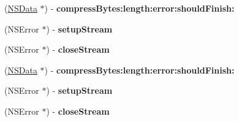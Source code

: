 \begin{DoxyCompactItemize}
\item 
\hypertarget{interface_a_s_i_data_compressor_a2190fb1c48f0fcc0a68fecbf04552f8c}{
(\hyperlink{class_n_s_data}{\-N\-S\-Data} $\ast$) -\/ {\bfseries compress\-Bytes\-:length\-:error\-:should\-Finish\-:}}
\label{interface_a_s_i_data_compressor_a2190fb1c48f0fcc0a68fecbf04552f8c}

\item 
\hypertarget{interface_a_s_i_data_compressor_af1a40ec1ac24132c7349fc0658639dfa}{
(\-N\-S\-Error $\ast$) -\/ {\bfseries setup\-Stream}}
\label{interface_a_s_i_data_compressor_af1a40ec1ac24132c7349fc0658639dfa}

\item 
\hypertarget{interface_a_s_i_data_compressor_a51d7144538df7dd6a6a19f91f9bfe298}{
(\-N\-S\-Error $\ast$) -\/ {\bfseries close\-Stream}}
\label{interface_a_s_i_data_compressor_a51d7144538df7dd6a6a19f91f9bfe298}

\item 
\hypertarget{interface_a_s_i_data_compressor_a2190fb1c48f0fcc0a68fecbf04552f8c}{
(\hyperlink{class_n_s_data}{\-N\-S\-Data} $\ast$) -\/ {\bfseries compress\-Bytes\-:length\-:error\-:should\-Finish\-:}}
\label{interface_a_s_i_data_compressor_a2190fb1c48f0fcc0a68fecbf04552f8c}

\item 
\hypertarget{interface_a_s_i_data_compressor_af1a40ec1ac24132c7349fc0658639dfa}{
(\-N\-S\-Error $\ast$) -\/ {\bfseries setup\-Stream}}
\label{interface_a_s_i_data_compressor_af1a40ec1ac24132c7349fc0658639dfa}

\item 
\hypertarget{interface_a_s_i_data_compressor_a51d7144538df7dd6a6a19f91f9bfe298}{
(\-N\-S\-Error $\ast$) -\/ {\bfseries close\-Stream}}
\label{interface_a_s_i_data_compressor_a51d7144538df7dd6a6a19f91f9bfe298}

\end{DoxyCompactItemize}
